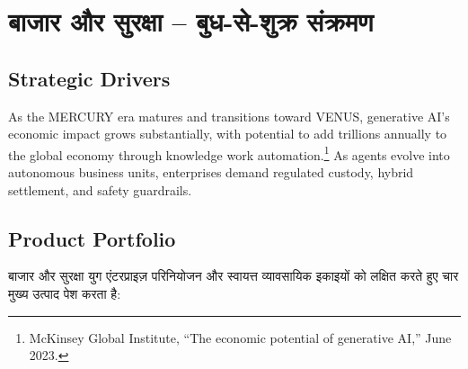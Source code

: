 \documentclass[11pt]{article}
\begin{document}
\section{बाजार और सुरक्षा -- बुध-से-शुक्र संक्रमण}
\subsection{Strategic Drivers}
As the MERCURY era matures and transitions toward VENUS, generative AI's economic impact grows substantially, with potential to add trillions annually to the global economy through knowledge work automation.\footnote{McKinsey Global Institute, ``The economic potential of generative AI,'' June 2023.} As agents evolve into autonomous business units, enterprises demand regulated custody, hybrid settlement, and safety guardrails.

\subsection{Product Portfolio}
बाजार और सुरक्षा युग एंटरप्राइज़ परिनियोजन और स्वायत्त व्यावसायिक इकाइयों को लक्षित करते हुए चार मुख्य उत्पाद पेश करता है:
\end{document}
